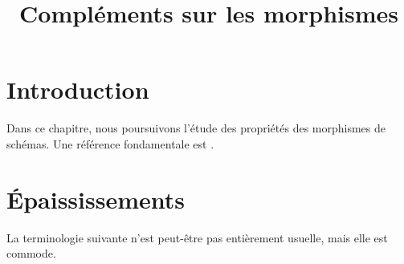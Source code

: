 

%

\title{Compléments sur les morphismes}


\maketitle

\label{section-phantom}

\tableofcontents

\section{Introduction}
\label{section-introduction}

\noindent
Dans ce chapitre, nous poursuivons l'étude des propriétés des morphismes de schémas.
Une référence fondamentale est \cite{EGA}.






\section{Épaississements}
\label{section-thickenings}

\noindent
La terminologie suivante n'est peut-être pas entièrement usuelle, mais elle est commode.


